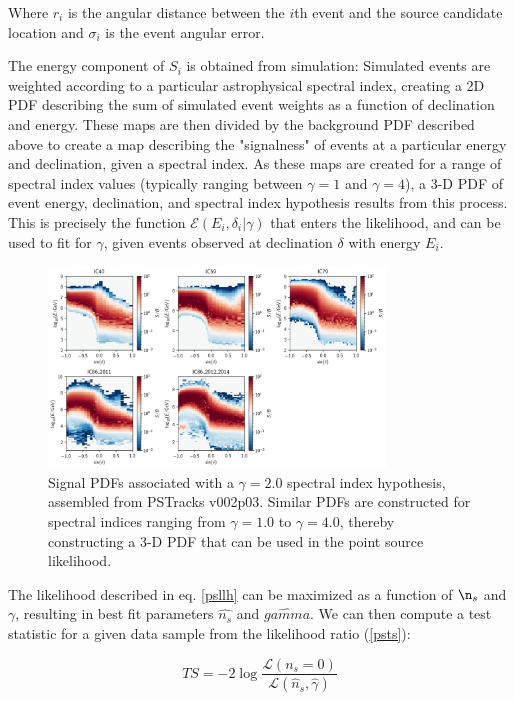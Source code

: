Where $r_i$ is the angular distance between the $i$th event and the source candidate location and $\sigma_i$ is the event angular error.  

The energy component of $S_i$ is obtained from simulation: Simulated events are weighted according to a particular astrophysical spectral index, creating a 2D PDF describing the sum of simulated event weights as a function of declination and energy. These maps are then divided by the background PDF described above to create a map describing the "signalness" of events at a particular energy and declination, given a spectral index. As these maps are created for a range of spectral index values (typically ranging between $\gamma=1$ and $\gamma=4$), a 3-D PDF of event energy, declination, and spectral index hypothesis results from this process. This is precisely the function $\mathcal{E}(E_i, \delta_i|\gamma)$ that enters the likelihood, and can be used to fit for $\gamma$, given events observed at declination $\delta$ with energy $E_i$.  

\begin{figure}[h]
\centering
\includegraphics[width=0.8\textwidth]{figs/sig_hists.png}
\caption{Signal PDFs associated with a $\gamma=2.0$ spectral index hypothesis, assembled from PSTracks v002p03. Similar PDFs are constructed for spectral indices ranging from $\gamma=1.0$ to $\gamma=4.0$, thereby constructing a 3-D PDF that can be used in the point source likelihood.}
\label{fig:SigPDf}
\end{figure}

The likelihood described in eq. \ref{psllh} can be maximized as a function of $\n_s$ and $\gamma$, resulting in best fit parameters $\hat{n_s}$ and $\hat{gamma}$. We can then compute a test statistic for a given data sample from the likelihood ratio (\ref{psts}):

\begin{equation}
    TS = -2 \log \frac{\mathcal{L}(n_s=0)}{\mathcal{L}(\hat{n}_s, \hat{\gamma})}
    \label{psts}
\end{equation}

